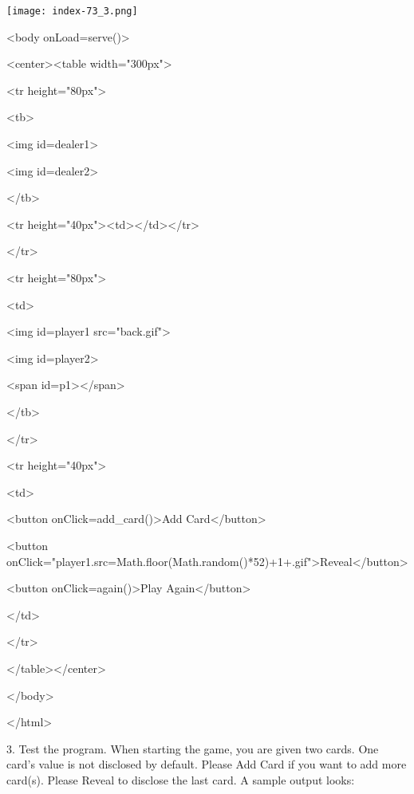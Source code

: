 \documentclass[
]{article}
\begin{document}
\texttt{[image: index-73\_3.png]}

\textless body onLoad=serve()\textgreater{}

\textless center\textgreater\textless table width="300px"\textgreater{}

\textless tr height="80px"\textgreater{}

\textless tb\textgreater{}

\textless img id=dealer1\textgreater{}

\textless img id=dealer2\textgreater{}

\textless/tb\textgreater{}

\textless tr
height="40px"\textgreater\textless td\textgreater\textless/td\textgreater\textless/tr\textgreater{}

\textless/tr\textgreater{}

\textless tr height="80px"\textgreater{}

\textless td\textgreater{}

\textless img id=player1 src="back.gif"\textgreater{}

\textless img id=player2\textgreater{}

\textless span id=p1\textgreater\textless/span\textgreater{}

\textless/tb\textgreater{}

\textless/tr\textgreater{}

\textless tr height="40px"\textgreater{}

\textless td\textgreater{}

\textless button onClick=add\_card()\textgreater Add
Card\textless/button\textgreater{}

\textless button
onClick="player1.src=Math.floor(Math.random()*52)+1+\textquotesingle.gif\textquotesingle"\textgreater Reveal\textless/button\textgreater{}

\textless button onClick=again()\textgreater Play
Again\textless/button\textgreater{}

\textless/td\textgreater{}

\textless/tr\textgreater{}

\textless/table\textgreater\textless/center\textgreater{}

\textless/body\textgreater{}

\textless/html\textgreater{}

3. Test the program. When starting the game, you are given two cards.
One card's value is not disclosed by default. Please Add Card if you
want to add more card(s). Please Reveal to disclose the last card. A
sample output looks:
\end{document}
